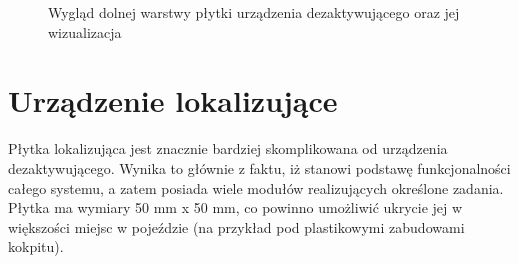 \begin{figure}[H]
\centering
	\qquad
	
	\caption{Wygląd dolnej warstwy płytki urządzenia dezaktywującego oraz jej wizualizacja}
	\label{fig:image_key_tag_bottom_board}
\end{figure}

\section{Urządzenie lokalizujące}

Płytka lokalizująca jest znacznie bardziej skomplikowana od urządzenia dezaktywującego. Wynika to głównie z faktu, iż stanowi podstawę funkcjonalności całego systemu, a zatem posiada wiele modułów realizujących określone zadania. Płytka ma wymiary 50 mm x 50 mm, co powinno umożliwić ukrycie jej w większości miejsc w pojeździe (na przykład pod plastikowymi zabudowami kokpitu). 

